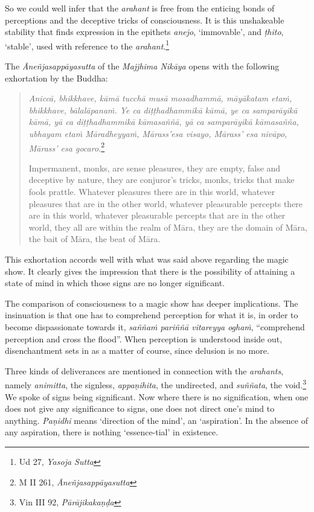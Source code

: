 So we could well infer that the \emph{arahant} is free from the enticing bonds of perceptions and the deceptive tricks of consciousness. It is this unshakeable stability that finds expression in the epithets \emph{anejo}, `immovable', and \emph{ṭhito}, `stable', used with reference to the \emph{arahant}.\footnote{Ud 27, \emph{Yasoja Sutta}}

The \emph{Āneñjasappāyasutta} of the \emph{Majjhima Nikāya} opens with the following exhortation by the Buddha:

\begin{quote}
\emph{Aniccā, bhikkhave, kāmā tucchā musā mosadhammā, māyākatam etaṁ, bhikkhave, bālalāpanaṁ. Ye ca diṭṭhadhammikā kāmā, ye ca samparāyikā kāmā, yā ca diṭṭhadhammikā kāmasaññā, yā ca samparāyikā kāmasañña, ubhayam etaṁ Māradheyyaṁ, Mārass'esa visayo, Mārass' esa nivāpo, Mārass' esa gocaro.}\footnote{M II 261, \emph{Āneñjasappāyasutta}}

Impermanent, monks, are sense pleasures, they are empty, false and deceptive by nature, they are conjuror's tricks, monks, tricks that make fools prattle. Whatever pleasures there are in this world, whatever pleasures that are in the other world, whatever pleasurable percepts there are in this world, whatever pleasurable percepts that are in the other world, they all are within the realm of Māra, they are the domain of Māra, the bait of Māra, the beat of Māra.
\end{quote}

This exhortation accords well with what was said above regarding the magic show. It clearly gives the impression that there is the possibility of attaining a state of mind in which those signs are no longer significant.

The comparison of consciousness to a magic show has deeper implications. The insinuation is that one has to comprehend perception for what it is, in order to become dispassionate towards it, \emph{saññaṁ pariññā vitareyya oghaṁ}, ``comprehend perception and cross the flood''. When perception is understood inside out, disenchantment sets in as a matter of course, since delusion is no more.

Three kinds of deliverances are mentioned in connection with the \emph{arahants}, namely \emph{animitta}, the signless, \emph{appaṇihita}, the undirected, and \emph{suññata}, the void.\footnote{Vin III 92, \emph{Pārājikakaṇḍa}} We spoke of signs being significant. Now where there is no signification, when one does not give any significance to signs, one does not direct one's mind to anything. \emph{Paṇidhi} means `direction of the mind', an `aspiration'. In the absence of any aspiration, there is nothing `essence-tial' in existence.


